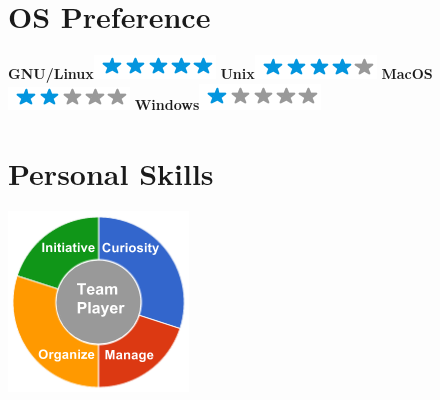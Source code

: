 \documentclass[]{friggeri-cv}
\begin{document}
\begin{aside}
  \section{OS Preference}
    \textbf{GNU/Linux}\includegraphics[scale=0.40]{img/5stars.png}
    \textbf{Unix}\includegraphics[scale=0.40]{img/4stars.png}
    \textbf{MacOS}\includegraphics[scale=0.40]{img/2stars.png}
    \textbf{Windows}\includegraphics[scale=0.40]{img/1stars.png}
    ~
  \section{Personal Skills}
    \includegraphics[scale=0.62]{img/personal.png}
    ~
\end{aside}
\end{document}
